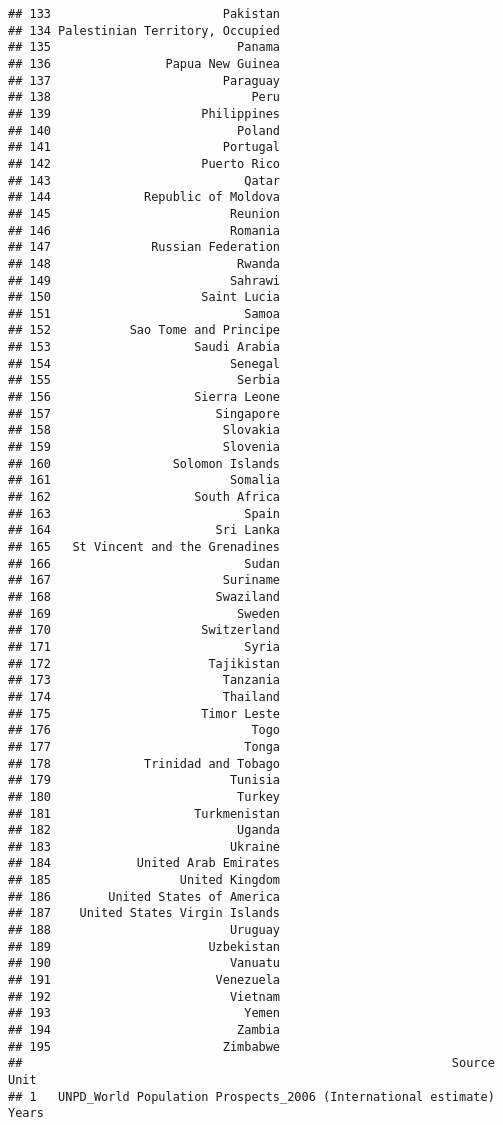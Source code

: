 \documentclass[]{article}
\begin{document}
\begin{verbatim}
## 133                        Pakistan
## 134 Palestinian Territory, Occupied
## 135                          Panama
## 136                Papua New Guinea
## 137                        Paraguay
## 138                            Peru
## 139                     Philippines
## 140                          Poland
## 141                        Portugal
## 142                     Puerto Rico
## 143                           Qatar
## 144             Republic of Moldova
## 145                         Reunion
## 146                         Romania
## 147              Russian Federation
## 148                          Rwanda
## 149                         Sahrawi
## 150                     Saint Lucia
## 151                           Samoa
## 152           Sao Tome and Principe
## 153                    Saudi Arabia
## 154                         Senegal
## 155                          Serbia
## 156                    Sierra Leone
## 157                       Singapore
## 158                        Slovakia
## 159                        Slovenia
## 160                 Solomon Islands
## 161                         Somalia
## 162                    South Africa
## 163                           Spain
## 164                       Sri Lanka
## 165   St Vincent and the Grenadines
## 166                           Sudan
## 167                        Suriname
## 168                       Swaziland
## 169                          Sweden
## 170                     Switzerland
## 171                           Syria
## 172                      Tajikistan
## 173                        Tanzania
## 174                        Thailand
## 175                     Timor Leste
## 176                            Togo
## 177                           Tonga
## 178             Trinidad and Tobago
## 179                         Tunisia
## 180                          Turkey
## 181                    Turkmenistan
## 182                          Uganda
## 183                         Ukraine
## 184            United Arab Emirates
## 185                  United Kingdom
## 186        United States of America
## 187    United States Virgin Islands
## 188                         Uruguay
## 189                      Uzbekistan
## 190                         Vanuatu
## 191                       Venezuela
## 192                         Vietnam
## 193                           Yemen
## 194                          Zambia
## 195                        Zimbabwe
##                                                            Source  Unit
## 1   UNPD_World Population Prospects_2006 (International estimate) Years

\end{verbatim}
\end{document}
